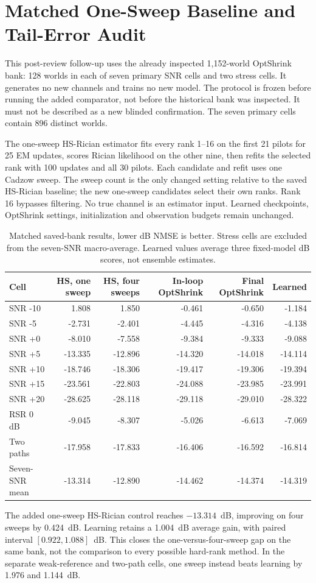 \section{Matched One-Sweep Baseline and Tail-Error Audit}
This post-review follow-up uses the already inspected 1,152-world
OptShrink bank: 128 worlds in each of seven primary SNR cells and two
stress cells. It generates no new channels and trains no new model.
The protocol is frozen before running the added comparator, not before
the historical bank was inspected. It must not be described as a new
blinded confirmation. The seven primary cells contain 896 distinct worlds.

The one-sweep HS-Rician estimator fits every rank 1--16 on the first
21 pilots for 25 EM updates, scores Rician likelihood on the other nine,
then refits the selected rank with 100 updates and all 30 pilots.
Each candidate and refit uses one Cadzow sweep. The sweep count is the
only changed setting relative to the saved HS-Rician baseline; the new
one-sweep candidates select their own ranks. Rank 16 bypasses filtering.
No true channel is an estimator input. Learned checkpoints, OptShrink
settings, initialization and observation budgets remain unchanged.

\begin{table}[!t]
\caption{Matched saved-bank results, lower dB NMSE is better. Stress cells
are excluded from the seven-SNR macro-average. Learned values average
three fixed-model dB scores, not ensemble estimates.}
\centering\small\setlength{\tabcolsep}{5pt}
\begin{tabular}{@{}lrrrrr@{}}\toprule
Cell & HS, one sweep & HS, four sweeps & In-loop OptShrink & Final OptShrink & Learned\\\midrule
SNR -10 & 1.808 & 1.850 & -0.461 & -0.650 & -1.184\\
SNR -5 & -2.731 & -2.401 & -4.445 & -4.316 & -4.138\\
SNR +0 & -8.010 & -7.558 & -9.384 & -9.333 & -9.088\\
SNR +5 & -13.335 & -12.896 & -14.320 & -14.018 & -14.114\\
SNR +10 & -18.746 & -18.306 & -19.417 & -19.306 & -19.394\\
SNR +15 & -23.561 & -22.803 & -24.088 & -23.985 & -23.991\\
SNR +20 & -28.625 & -28.118 & -29.118 & -29.010 & -28.322\\
RSR 0 dB & -9.045 & -8.307 & -5.026 & -6.613 & -7.069\\
Two paths & -17.958 & -17.833 & -16.406 & -16.592 & -16.814\\
\midrule Seven-SNR mean & -13.314 & -12.890 & -14.462 & -14.374 & -14.319\\\bottomrule\end{tabular}\end{table}
The added one-sweep HS-Rician control reaches $-13.314$~dB,
improving on four sweeps by 0.424~dB. Learning retains a
1.004~dB average gain, with paired interval
$[0.922,1.088]$~dB. This closes the
one-versus-four-sweep gap on the same bank, not the comparison to every
possible hard-rank method. In the separate weak-reference and two-path
cells, one sweep instead beats learning by
1.976 and
1.144~dB.


